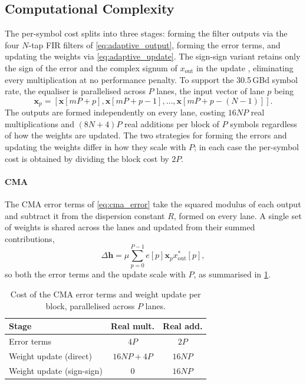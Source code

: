 \documentclass[12pt,a4paper]{article}
\begin{document}
\subsection{Computational Complexity}
The per-symbol cost splits into three stages: forming the filter outputs via the four $N$-tap FIR filters of \cref{eq:adaptive_output}, forming the error terms, and updating the weights via \cref{eq:adaptive_update}. The sign-sign variant retains only the sign of the error and the complex signum of $x_\mathrm{out}$ in the update \cite{Cardenas:14}, eliminating every multiplication at no performance penalty. To support the 30.5\,GBd symbol rate, the equaliser is parallelised across $P$ lanes, the input vector of lane $p$ being
\begin{equation}
    \mathbf{x}_p = \left[\mathbf{x}[mP + p], \mathbf{x}[mP + p - 1], \dots, \mathbf{x}[mP + p - (N - 1)]\right].
\end{equation}
The outputs are formed independently on every lane, costing $16NP$ real multiplications and $(8N+4)P$ real additions per block of $P$ symbols regardless of how the weights are updated. The two strategies for forming the errors and updating the weights differ in how they scale with $P$; in each case the per-symbol cost is obtained by dividing the block cost by $2P$.

\paragraph{CMA}
The CMA error terms of \cref{eq:cma_error} take the squared modulus of each output and subtract it from the dispersion constant $R$, formed on every lane. A single set of weights is shared across the lanes and updated from their summed contributions,
\begin{equation}
    \Delta \mathbf{h} = \mu \sum_{p=0}^{P-1}e[p]\mathbf{x}_p x_\mathrm{out}^*[p],
\end{equation}
so both the error terms and the update scale with $P$, as summarised in \cref{tab:adaptive_cost_cma}.
\begin{table}[H]
    \centering
    \begin{tabular}{lcc}
        \toprule
        Stage & Real mult. & Real add. \\
        \midrule
        Error terms               & $4P$      & $2P$ \\
        Weight update (direct)    & $16NP+4P$ & $16NP$ \\
        Weight update (sign-sign) & $0$       & $16NP$ \\
        \bottomrule
    \end{tabular}
    \caption{Cost of the CMA error terms and weight update per block, parallelised across $P$ lanes.}
    \label{tab:adaptive_cost_cma}
\end{table}
\end{document}
